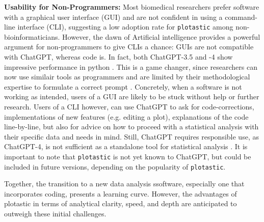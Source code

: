 \textbf{Usability for Non-Programmers:}
Most biomedical researchers prefer software with a graphical user interface
(GUI) and are not confident in using a command-line interface (CLI), suggesting
a low adoption rate for \texttt{plotastic} among non-bioinformaticians. However,
the dawn of Artificial intelligence provides a powerful argument for
non-programmers to give CLIs a chance: GUIs are not compatible with ChatGPT,
whereas code is. In fact, both ChatGPT-3.5 and -4 show impressive performance in
python \cite{arefinUnmaskingGiantComprehensive2023}. This is a game changer,
since researchers can now use similair tools as programmers and are limited by
their methodological expertise to formulate a correct prompt
\cite{qureshiAreChatGPTLarge2023}. Concretely, when a software is not working
as intended, users of a GUI are likely to be stuck without help or further
research. Users of a CLI however, can use ChatGPT to ask for code-corrections,
implementations of new features (e.g. editing a plot), explanations of the code
line-by-line, but also for advice on how to proceed with a statistical analysis
with their specific data and needs in mind. Still, ChatGPT requires responsible
use, as ChatGPT-4, is not sufficient as a standalone tool for statistical
analysis \cite{ordakChatGPTSkillsStatistical2023}. It is important to note that
\texttt{plotastic} is not yet known to ChatGPT, but could be included in future
versions, depending on the popularity of \texttt{plotastic}.

Together, the transition to a new data analysis ssoftware, especially one
that incorporates coding, presents a learning curve. However, the advantages of
plotastic in terms of analytical clarity, speed, and depth are anticipated to
outweigh these initial challenges.




